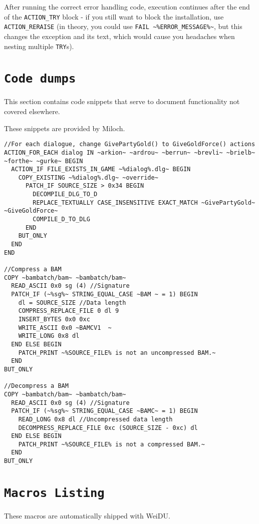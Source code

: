 \documentclass{article}
\def\DEFINE#1{{\tt \bf #1}\label{#1}\index{#1}}
\begin{document}
After running the correct error handling code, execution continues after the
end of the \verb+ACTION_TRY+ block - if you still want to block the
installation, use \verb+ACTION_RERAISE+ (in theory, you could use
\verb+FAIL ~%ERROR_MESSAGE%~+, but this changes the exception and its text,
which would cause you headaches when nesting multiple \verb+TRY+s).

\section{\DEFINE{Code dumps}}
This section contains code snippets that serve to document functionality
not covered elsewhere.

These snippets are provided by Miloch.
\begin{verbatim}
//For each dialogue, change GivePartyGold() to GiveGoldForce() actions
ACTION_FOR_EACH dialog IN ~arkion~ ~ardrou~ ~berrun~ ~brevli~ ~brielb~ ~forthe~ ~gurke~ BEGIN
  ACTION_IF FILE_EXISTS_IN_GAME ~%dialog%.dlg~ BEGIN
    COPY_EXISTING ~%dialog%.dlg~ ~override~
      PATCH_IF SOURCE_SIZE > 0x34 BEGIN
        DECOMPILE_DLG_TO_D
        REPLACE_TEXTUALLY CASE_INSENSITIVE EXACT_MATCH ~GivePartyGold~ ~GiveGoldForce~
        COMPILE_D_TO_DLG
      END
    BUT_ONLY
  END
END

//Compress a BAM
COPY ~bambatch/bam~ ~bambatch/bam~
  READ_ASCII 0x0 sg (4) //Signature
  PATCH_IF (~%sg%~ STRING_EQUAL_CASE ~BAM ~ = 1) BEGIN
    dl = SOURCE_SIZE //Data length
    COMPRESS_REPLACE_FILE 0 dl 9
    INSERT_BYTES 0x0 0xc
    WRITE_ASCII 0x0 ~BAMCV1  ~
    WRITE_LONG 0x8 dl
  END ELSE BEGIN
    PATCH_PRINT ~%SOURCE_FILE% is not an uncompressed BAM.~
  END
BUT_ONLY

//Decompress a BAM
COPY ~bambatch/bam~ ~bambatch/bam~
  READ_ASCII 0x0 sg (4) //Signature
  PATCH_IF (~%sg%~ STRING_EQUAL_CASE ~BAMC~ = 1) BEGIN
    READ_LONG 0x8 dl //Uncompressed data length
    DECOMPRESS_REPLACE_FILE 0xc (SOURCE_SIZE - 0xc) dl
  END ELSE BEGIN
    PATCH_PRINT ~%SOURCE_FILE% is not a compressed BAM.~
  END
BUT_ONLY
\end{verbatim}

\section{\DEFINE{Macros Listing}}
These macros are automatically shipped with WeiDU.
\end{document}
